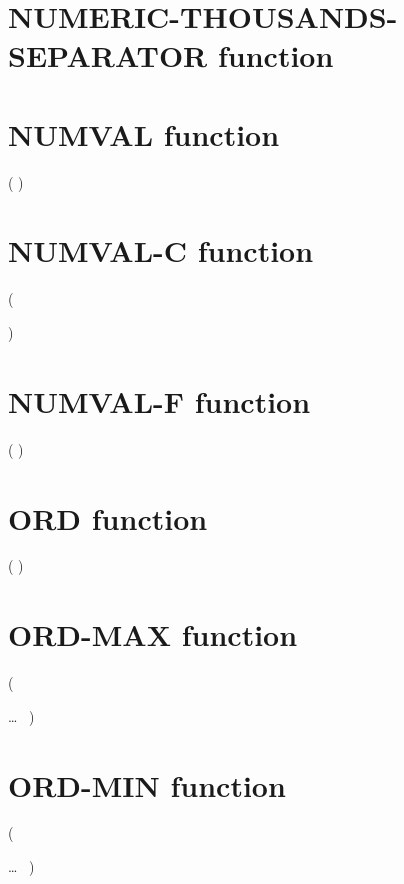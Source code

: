 
\section{NUMERIC-THOUSANDS-SEPARATOR function}


\section{NUMVAL function}

  ( \argument )

\section{NUMVAL-C function}

  ( \argument
\begin{0-1}
  \argument
\end{0-1}
)

\section{NUMVAL-F function}

  ( \argument )

\section{ORD function}

  ( \argument )

\section{ORD-MAX function}

  (
\begin{1=}
  \argument
\end{1=} \ldots
\ {})

\section{ORD-MIN function}

  (
\begin{1=}
  \argument
\end{1=} \ldots
\ {})

